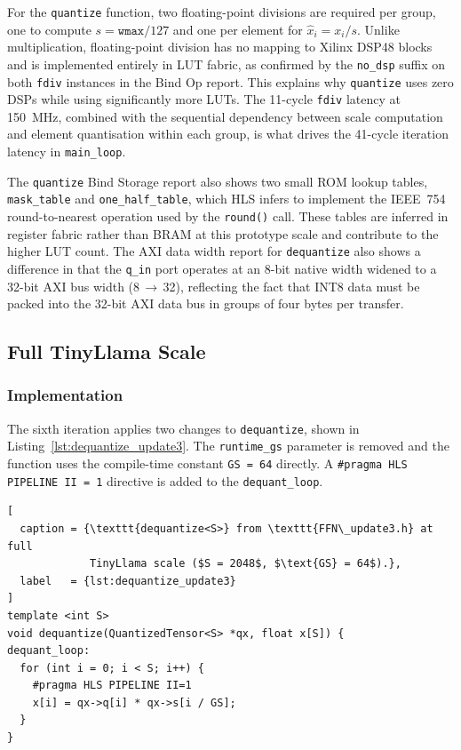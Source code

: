 For the \texttt{quantize} function, two floating-point divisions are required per
group, one to compute $s = \texttt{wmax}/127$ and one per element for
$\hat{x}_i = x_i/s$. Unlike multiplication, floating-point division has
no mapping to Xilinx DSP48 blocks and is implemented entirely in LUT
fabric, as confirmed by the \texttt{no\_dsp} suffix on both
\texttt{fdiv} instances in the Bind Op report. This explains why
\texttt{quantize} uses zero DSPs while using significantly more LUTs.
The 11-cycle \texttt{fdiv} latency at \SI{150}{\mega\hertz}, combined
with the sequential dependency between scale computation and element
quantisation within each group, is what drives the 41-cycle iteration
latency in \texttt{main\_loop}.

The \texttt{quantize} Bind Storage
report also shows two small ROM lookup tables,
\texttt{mask\_table} and \texttt{one\_half\_table}, which HLS infers to
implement the IEEE~754 round-to-nearest operation used by the
\texttt{round()} call. These tables are inferred in register fabric
rather than BRAM at this prototype scale and contribute to the higher
LUT count. The AXI data width report for \texttt{dequantize} also shows
a difference in that the \texttt{q\_in} port operates at an 8-bit
native width widened to a 32-bit AXI bus width (8\,$\rightarrow$\,32),
reflecting the fact that INT8 data must be packed into the 32-bit AXI
data bus in groups of four bytes per transfer.


\subsection{Full TinyLlama Scale}
\label{subsec:dequantize_update3}

\subsubsection{Implementation}
\label{subsubsec:dequantize_update3_impl}

The sixth iteration applies two changes to \texttt{dequantize}, shown in
Listing~\ref{lst:dequantize_update3}. The \texttt{runtime\_gs} parameter
is removed and the function uses the compile-time constant
\texttt{GS\,=\,64} directly. A \texttt{\#pragma HLS PIPELINE II\,=\,1}
directive is added to the \texttt{dequant\_loop}.

\begin{lstlisting}[
  caption = {\texttt{dequantize<S>} from \texttt{FFN\_update3.h} at full
             TinyLlama scale ($S = 2048$, $\text{GS} = 64$).},
  label   = {lst:dequantize_update3}
]
template <int S>
void dequantize(QuantizedTensor<S> *qx, float x[S]) {
dequant_loop:
  for (int i = 0; i < S; i++) {
    #pragma HLS PIPELINE II=1
    x[i] = qx->q[i] * qx->s[i / GS];
  }
}
\end{lstlisting}

